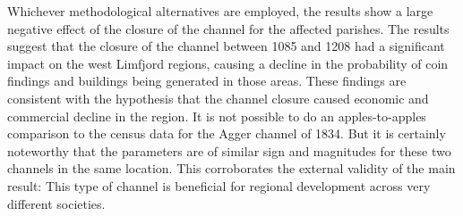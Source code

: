 \documentclass[11pt]{article}
\begin{document}
Whichever methodological alternatives are employed, the results show a large negative effect of the closure of the channel for the affected parishes. The results suggest that the closure of the channel between 1085 and 1208 had a significant impact on the west Limfjord regions, causing a decline in the probability of coin findings and buildings being generated in those areas. These findings are consistent with the hypothesis that the channel closure caused economic and commercial decline in the region. It is not possible to do an apples-to-apples comparison to the census data for the Agger channel of 1834. But it is certainly noteworthy that the parameters are of similar sign and magnitudes for these two channels in the same location. This corroborates the external validity of the main result: This type of channel is beneficial for regional development across very different societies. 
\end{document}
